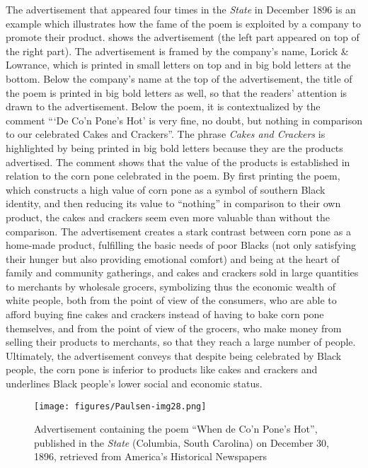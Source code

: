The advertisement that appeared four times in the \emph{State} in December 1896 is an example which illustrates how the fame of the poem is exploited by a company to promote their product.  shows the advertisement (the left part appeared on top of the right part). The advertisement is framed by the company’s name, Lorick \& Lowrance, which is printed in small letters on top and in big bold letters at the bottom. Below the company’s name at the top of the advertisement, the title of the poem is printed in big bold letters as well, so that the readers’ attention is drawn to the advertisement. Below the poem, it is contextualized by the comment “‘De Co’n Pone’s Hot’ is very fine, no doubt, but nothing in comparison to our celebrated Cakes and Crackers”. The phrase \emph{Cakes and Crackers} is highlighted by being printed in big bold letters because they are the products advertised. The comment shows that the value of the products is established in relation to the corn pone celebrated in the poem. By first printing the poem, which constructs a high value of corn pone as a symbol of southern Black identity, and then reducing its value to “nothing” in comparison to their own product, the cakes and crackers seem even more valuable than without the comparison. The advertisement creates a stark contrast between corn pone as a home-made product, fulfilling the basic needs of poor Blacks (not only satisfying their hunger but also providing emotional comfort) and being at the heart of family and community gatherings, and cakes and crackers sold in large quantities to merchants by wholesale grocers, symbolizing thus the economic wealth of white people, both from the point of view of the consumers, who are able to afford buying fine cakes and crackers instead of having to bake corn pone themselves, and from the point of view of the grocers, who make money from selling their products to merchants, so that they reach a large number of people. Ultimately, the advertisement conveys that despite being celebrated by Black people, the corn pone is inferior to products like cakes and crackers and underlines Black people’s lower social and economic status.


\begin{figure}
\texttt{[image: figures/Paulsen-img28.png]}
\caption{
Advertisement containing the poem “When de Co’n Pone’s Hot”, published in the \emph{State} (Columbia, South Carolina) on December 30, 1896, retrieved from America's Historical Newspapers
}
\label{fig:key:28}
\end{figure}


